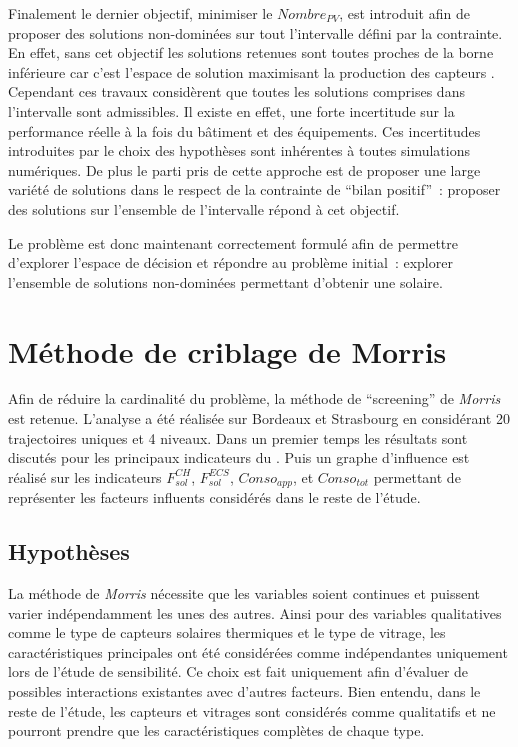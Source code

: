 Finalement le dernier objectif, minimiser le $Nombre_{PV}$, est introduit afin de proposer
des solutions non-dominées sur tout l’intervalle défini par la contrainte. En effet,
sans cet objectif les solutions retenues sont toutes proches de la borne inférieure car
c’est l’espace de solution maximisant la production des capteurs . Cependant ces
travaux considèrent que toutes les solutions comprises dans l’intervalle sont admissibles.
Il existe en effet, une forte incertitude sur la performance réelle à la fois du bâtiment
et des équipements. Ces incertitudes introduites par le choix des hypothèses sont
inhérentes à toutes simulations numériques. De plus le parti pris de cette approche est de
proposer une large variété de solutions dans le respect de la contrainte de \enquote{bilan
positif}~: proposer des solutions sur l’ensemble de l’intervalle répond à cet objectif.

Le problème est donc maintenant correctement formulé afin de permettre d’explorer l’espace
de décision et répondre au problème initial~: explorer l’ensemble de solutions non-dominées
permettant d’obtenir une  solaire.



\section{Méthode de criblage de Morris} %
\label{sec:methode_criblage_de_morris}
Afin de réduire la cardinalité du problème, la méthode de \enquote{screening} de
\textit{Morris} est retenue. L’analyse a été réalisée sur Bordeaux et Strasbourg en
considérant \num{20} trajectoires uniques et \num{4} niveaux. Dans un premier temps les
résultats sont discutés pour les principaux indicateurs du . Puis un graphe
d’influence est réalisé sur les indicateurs $F_{sol}^{CH}$, $F_{sol}^{ECS}$,
$Conso_{app}$, et $Conso_{tot}$ permettant de représenter les facteurs influents
considérés dans le reste de l’étude.

\subsection{Hypothèses} %
\label{sub:hypotheses_morris}
La méthode de \textit{Morris} nécessite que les variables soient continues et
puissent varier indépendamment les unes des autres. Ainsi pour des variables qualitatives
comme le type de capteurs solaires thermiques et le type de vitrage, les caractéristiques
principales ont été considérées comme indépendantes uniquement lors de l’étude de
sensibilité. Ce choix est fait uniquement afin d’évaluer de possibles interactions existantes avec d’autres facteurs.
Bien entendu, dans le reste de l’étude, les capteurs et vitrages sont considérés comme
qualitatifs et ne pourront prendre que les caractéristiques complètes de chaque type.

